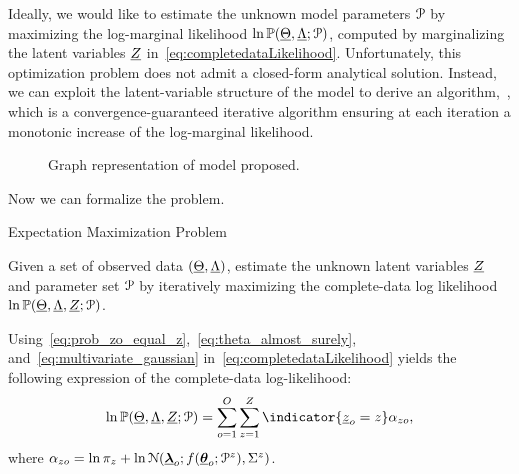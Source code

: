 \documentclass[../main.tex]{subfiles}
\begin{document}
Ideally, we would like to estimate the unknown model parameters $\mathcal{P}$ by maximizing the log-marginal likelihood $\ln \mathbb{P}(\underline{\Theta},\underline{\Lambda};\mathcal{P})$, computed by marginalizing the latent variables $\underline{Z}$ in~\eqref{eq:completedataLikelihood}.
Unfortunately, this optimization problem does not admit a closed-form analytical solution.
Instead, we can exploit the latent-variable structure of the model to derive an \EM{} algorithm,~\cite{DempsterEtAl1977}, which is a convergence-guaranteed iterative algorithm ensuring at each iteration a monotonic increase of the log-marginal likelihood.

\begin{figure}[b]
  \centering
  \caption{Graph representation of model proposed.}\label{fig:model}
\end{figure}

Now we can formalize the \EM{} problem.
\begin{problem}{Expectation Maximization Problem}\label{pb:EM}

  Given a set of observed data $(\underline{\Theta},\underline{\Lambda})$, estimate the unknown latent variables $\underline{Z}$ and parameter set $\mathcal{P}$ by iteratively maximizing  the complete-data log likelihood $\ln\mathbb{P}(\underline{\Theta},\underline{\Lambda},\underline{Z};\mathcal{P})$.
\end{problem}

Using~\eqref{eq:prob_zo_equal_z},~\eqref{eq:theta_almost_surely}, and~\eqref{eq:multivariate_gaussian} in~\eqref{eq:completedataLikelihood} yields {\color{blue}the following expression of the complete-data log-likelihood:}
\begin{equation}\label{eq:completedataLogLikelihood_complete}
  \ln\probability{\random{\Theta},\random{\Lambda},\random{Z};\set{P}}=  \sum_{o=1}^{O}\sum_{z=1}^{Z}{\indicator{\random{z}_{o}=z}}
  \alpha_{zo},
\end{equation}
where ${\alpha_{zo}=\ln{\pi_{z}}+\ln{\mathcal{N}({\underline{\boldsymbol{\lambda}}}_{o};f({\underline{\boldsymbol{\theta}}}_{o};\mathcal{P}^{z}),{\Sigma^{z}})}}$.
\end{document}

